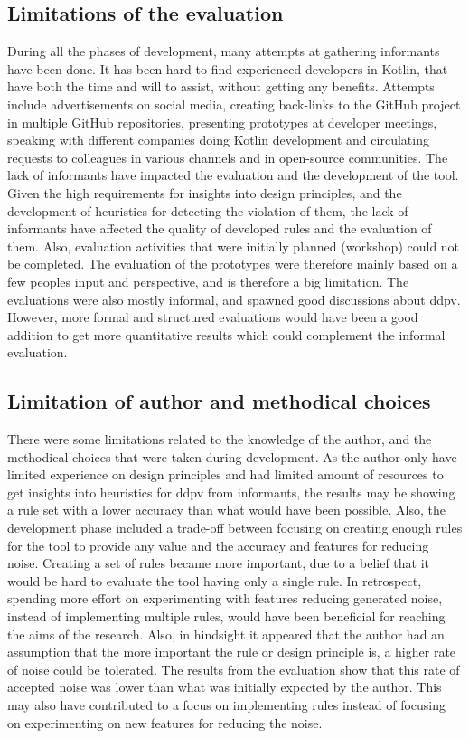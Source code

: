 \documentclass[pdftex,10pt,b5paper,twoside]{report}
\begin{document}
\subsection*{Limitations of the evaluation}
During all the phases of development, many attempts at gathering informants have been done. It has been hard to find experienced developers in Kotlin, that have both the time and will to assist, without getting any benefits. Attempts include advertisements on social media, creating back-links to the GitHub project in multiple GitHub repositories, presenting prototypes at developer meetings, speaking with different companies doing Kotlin development and circulating requests to colleagues in various channels and in open-source communities. The lack of informants have impacted the evaluation and the development of the tool. Given the high requirements for insights into design principles, and the development of heuristics for detecting the violation of them, the lack of informants have affected the quality of developed rules and the evaluation of them. Also, evaluation activities that were initially planned (workshop) could not be completed. The evaluation of the prototypes were therefore mainly based on a few peoples input and perspective, and is therefore a big limitation. The evaluations were also mostly informal, and spawned good discussions about \gls{ddpv}. However, more formal and structured evaluations would have been a good addition to get more quantitative results which could complement the informal evaluation.


\subsection*{Limitation of author and methodical choices}
There were some limitations related to the knowledge of the author, and the methodical choices that were taken during development. As the author only have limited experience on design principles and had limited amount of resources to get insights into heuristics for \gls{ddpv} from informants, the results may be showing a rule set with a lower accuracy than what would have been possible. Also, the development phase included a trade-off between focusing on creating enough rules for the tool to provide any value and the accuracy and features for reducing noise. Creating a set of rules became more important, due to a belief that it would be hard to evaluate the tool having only a single rule. In retrospect, spending more effort on experimenting with features reducing generated noise, instead of implementing multiple rules, would have been beneficial for reaching the aims of the research. Also, in hindsight it appeared that the author had an assumption that the more important the rule or design principle is, a higher rate of noise could be tolerated. The results from the evaluation show that this rate of accepted noise was lower than what was initially expected by the author. This may also have contributed to a focus on implementing rules instead of focusing on experimenting on new features for reducing the noise. 
\end{document}

